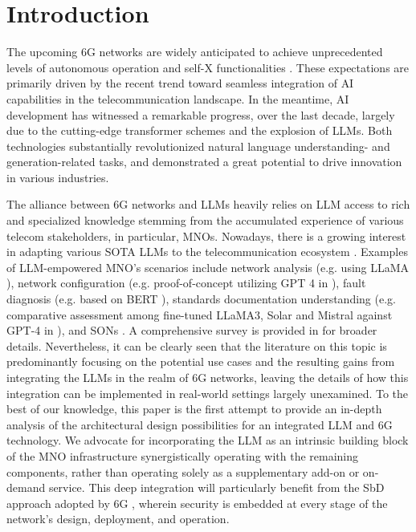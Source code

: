 \section{Introduction}
\label{sec:intro}
The upcoming 6G networks are widely anticipated to achieve unprecedented levels of autonomous operation and self-X functionalities \cite{chaoub2023hybrid}. These expectations are primarily driven by the recent trend toward seamless integration of \gls{AI} capabilities in the telecommunication landscape. In the meantime, \gls{AI} development has witnessed a remarkable progress, over the last decade, largely due to the cutting-edge transformer schemes \cite{vaswani2017attention} and the explosion of \glspl{LLM}. Both technologies substantially revolutionized natural language understanding- and generation-related tasks, and demonstrated a great potential to drive innovation in various industries.%

The alliance between 6G networks and \glspl{LLM} heavily relies on \gls{LLM} access to rich and specialized knowledge stemming from the accumulated experience of various telecom stakeholders, in particular, \glspl{MNO}. Nowadays, there is a growing interest in adapting various \gls{SOTA} \glspl{LLM} to the telecommunication ecosystem \cite{maatouk2024large}. Examples of \gls{LLM}-empowered \gls{MNO}'s scenarios include network analysis (e.g. using \gls{LLaMA} \cite{Kan2024mobile_llama}), network configuration (e.g. proof-of-concept utilizing \gls{GPT} 4 in \cite{Wang2024NetConfEval}), fault diagnosis (e.g. based on \gls{BERT} \cite{Chen2023Knowledge}), 
standards documentation understanding (e.g. comparative assessment among fine-tuned \gls{LLaMA}3, Solar and Mistral against \gls{GPT}-4 in \cite{Said2024instruct}), and \glspl{SON} \cite{Bariah2024Large}. A comprehensive survey is provided in \cite{Zhou2024survey} for broader details. Nevertheless, it can be clearly seen that the literature on this topic is predominantly focusing on the potential use cases and the resulting gains from integrating the \glspl{LLM} in the realm of 6G networks, leaving the details of how this integration can be implemented in real-world settings largely unexamined. To the best of our knowledge, this paper is the first attempt to provide an in-depth analysis of the architectural design possibilities for an integrated \gls{LLM} and 6G technology. We advocate for incorporating the \gls{LLM} as an intrinsic building block of the \gls{MNO} infrastructure synergistically operating with the remaining components, rather than operating solely as a supplementary add-on or on-demand service. This deep integration will particularly benefit from the \gls{SbD} approach adopted by 6G \cite{Khaloopour2024Resilience}, wherein security is embedded at every stage of the network’s design, deployment, and operation.

